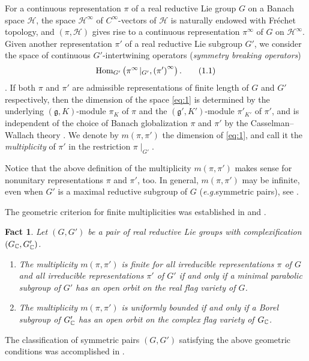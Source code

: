 \documentclass[reqno,12pt]{pja00} %
\newcommand{\Hom}{\mbox{\normalfont Hom}}
\newtheorem{fact}[theorem]{Fact}
\theoremstyle{definition}
\theoremstyle{exampstyle} \newtheorem{examp}[theorem]{Theorem}
\begin{document}
For a continuous representation $\pi$ of a real reductive Lie group $G$ on a Banach space $\mathcal{H}$, the space $\mathcal{H}^\infty$
of $C^\infty$-vectors of $\mathcal{H}$ is naturally endowed with Fr\'echet topology, and $(\pi,\mathcal{H})$ gives rise to a continuous
representation $\pi^\infty$
of $G$ on $\mathcal{H}^\infty$.
Given another representation $\pi'$ of a real reductive Lie subgroup $G'$, we consider the space of continuous $G'$-intertwining operators ({\it symmetry breaking operators})
\begin{equation}\label{eq:1}
	\Hom_{G'}\left( \pi^\infty\!\mid_{G'}, \left( \pi' \right)^\infty\right).\tag{1.1}
\end{equation}.
If both $\pi$ and $\pi'$ are admissible representations of finite length of $G$ and $G'$ respectively, then the dimension of the space \eqref{eq:1} is determined by the underlying
$(\mathfrak{g},K)$-module $\pi_K$ of $\pi$ and the $(\mathfrak{g}',K')$-module $\pi'_{K'}$ of $\pi'$, and is independent of the choice of Banach globalization $\pi$ and $\pi'$ by the 
Casselman--Wallach theory
\cite[Chap. 11]{wallach1988real2}. We denote by $m(\pi,\pi')$ the dimension of \eqref{eq:1}, and call it the {\it multiplicity} of $\pi'$ in the restriction $\pi\!\mid_{G'}$.

Notice that the above definition of the multiplicity $m(\pi,\pi')$ makes sense for nonunitary representations $\pi$ and $\pi'$, too. In general, $m(\pi,\pi')$ may be infinite, even when $G'$ is a 
maximal reductive subgroup of $G$
({\it e.g.}\;symmetric pairs), see \cite{Kobayashi2014}.

The geometric criterion for finite multiplicities was established in \cite{Kobayashi2014} and \cite{kobayashi2013finite}.
\begin{fact}\label{fact:1} Let $(G,G')$ be a pair of real reductive Lie groups with complexification $(G_{\mathbb{C}},G'_{\mathbb{C}})$.
	\begin{enumerate}[(1)]
		\item The multiplicity $m(\pi,\pi')$ is finite for all irreducible representations $\pi$ of $G$ and all irreducible representations $\pi'$ of $G'$ if and only if
			a minimal parabolic subgroup of $G'$ has an open orbit on the real flag variety of $G$.
		\item The multiplicity $m(\pi,\pi')$ is uniformly bounded if and only if a Borel subgroup of $G_{\mathbb{C}}'$ has an open orbit on the complex flag variety of $G_{\mathbb{C}}$.
	\end{enumerate}
\end{fact}
The classification of symmetric pairs $(G,G')$ satisfying the above geometric conditions was accomplished in \cite{kobayashi2014classification}.
\end{document}
